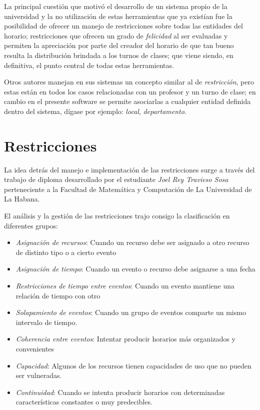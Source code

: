 La principal cuestión que motivó el desarrollo de un sistema propio de la universidad y la no utilización de estas herramientas que ya existían fue la posibilidad de ofrecer un manejo de restricciones sobre todas las entidades del horario; restricciones que ofrecen un grado de \emph{felicidad} al ser evaluadas y permiten la apreciación por parte del creador del horario de que tan bueno resulta la distribución brindada a los turnos de clases; que viene siendo, en definitiva, el punto central de todas estas herramientas. 

Otros autores manejan en sus sistemas un concepto similar al de \emph{restricción}, pero estas están en todos los casos relacionadas con un profesor y un turno de clase; en cambio en el presente software se permite asociarlas a cualquier entidad definida dentro del sistema, dígase por ejemplo: \emph{local}, \emph{departamento}.

\section{Restricciones}
\label{state_of_art:restrictions}
La idea detrás del manejo e implementación de las restricciones surge a través del trabajo de diploma desarrollado por el estudiante \textit{Joel Rey Travieso Sosa} perteneciente a la Facultad de Matemática y Computación de La Universidad de La Habana.

El análisis y la gestión de las restricciones trajo consigo la clasificación en diferentes grupos:
\begin{itemize}
	\item \textit{Asignación de recursos}: Cuando un recurso debe ser asignado a otro recurso de distinto tipo o a cierto evento
	\item \textit{Asignación de tiempo}: Cuando un evento o recurso debe asignarse a una fecha
	\item \textit{Restricciones de tiempo entre eventos}: Cuando un evento mantiene una relación de tiempo con otro
	\item \textit{Solapamiento de eventos}: Cuando un grupo de eventos comparte un mismo intervalo de tiempo.
	\item \textit{Coherencia entre eventos}: Intentar producir horarios más organizados y convenientes
	\item \textit{Capacidad}: Algunos de los recursos tienen capacidades de uso que no pueden ser vulneradas.
	\item \textit{Continuidad}: Cuando se intenta producir horarios con determinadas características constantes o muy predecibles.
	
\end{itemize}

